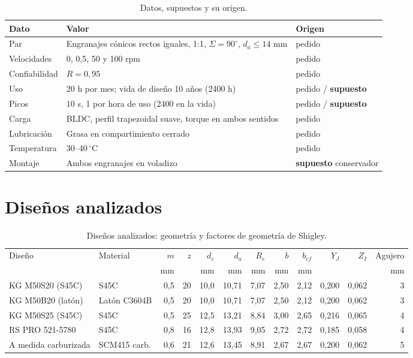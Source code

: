 \documentclass[11pt,a4paper]{article}
\begin{document}
\begin{table}[H]\centering\small
\caption{Datos, supuestos y su origen.}
\begin{tabularx}{\linewidth}{l X l}
\toprule
Dato & Valor & Origen\\\midrule
Par & Engranajes cónicos rectos iguales, 1:1, $\Sigma=90^\circ$, $d_a\le14$ mm & pedido\\
Velocidades & 0, 0,5, 50 y 100 rpm & pedido\\
Confiabilidad & $R=0{,}95$ & pedido\\
Uso & 20 h por mes; vida de diseño 10 años (2400 h) & pedido / \textbf{supuesto}\\
Picos & 10 s, 1 por hora de uso (2400 en la vida) & pedido / \textbf{supuesto}\\
Carga & BLDC, perfil trapezoidal suave, torque en ambos sentidos & pedido\\
Lubricación & Grasa en compartimiento cerrado & pedido\\
Temperatura & 30--40\,$^\circ$C & pedido\\
Montaje & Ambos engranajes en voladizo & \textbf{supuesto} conservador\\
\bottomrule
\end{tabularx}
\end{table}

\section{Diseños analizados}
\begin{table}[H]\centering\scriptsize\setlength{\tabcolsep}{3.5pt}
\caption{Diseños analizados: geometría y factores de geometría de Shigley.}\label{tab:disenos}
\begin{tabular}{l l r r r r r r r r r r}
\toprule
Diseño & Material & $m$ & $z$ & $d_e$ & $d_a$ & $R_e$ & $b$ & $b_{ef}$ & $Y_J$ & $Z_I$ & Agujero\\
 & & mm & & mm & mm & mm & mm & mm & & & mm\\
\midrule
KG M50S20 (S45C) & S45C & 0,5 & 20 & 10,0 & 10,71 & 7,07 & 2,50 & 2,12 & 0,200 & 0,062 & 3 \\
KG M50B20 (latón) & Latón C3604B & 0,5 & 20 & 10,0 & 10,71 & 7,07 & 2,50 & 2,12 & 0,200 & 0,062 & 3 \\
KG M50S25 (S45C) & S45C & 0,5 & 25 & 12,5 & 13,21 & 8,84 & 3,00 & 2,65 & 0,216 & 0,065 & 4 \\
RS PRO 521-5780 & S45C & 0,8 & 16 & 12,8 & 13,93 & 9,05 & 2,72 & 2,72 & 0,185 & 0,058 & 4 \\
A medida carburizada & SCM415 carb. & 0,6 & 21 & 12,6 & 13,45 & 8,91 & 2,67 & 2,67 & 0,200 & 0,062 & 5 \\
\bottomrule\end{tabular}\end{table}
\end{document}

